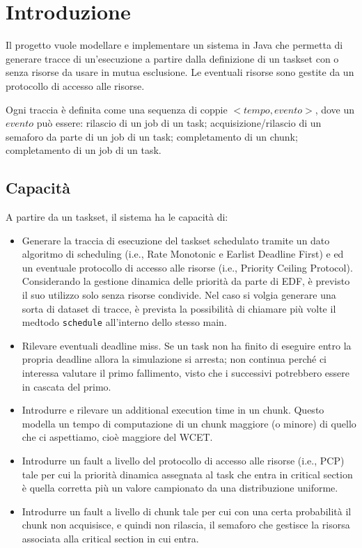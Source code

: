 \chapter{Introduzione}
Il progetto vuole modellare e implementare un sistema in Java che permetta di generare tracce di un'esecuzione a partire dalla definizione di un taskset con o senza risorse da usare in mutua esclusione. Le eventuali risorse sono gestite da un protocollo di accesso alle risorse.

Ogni traccia è definita come una sequenza di coppie $<tempo, evento>$, dove un $evento$ può essere: rilascio di un job di un task; acquisizione/rilascio di un semaforo da parte di un job di un task; completamento di un chunk; completamento di un job di un task.

\section{Capacità}
A partire da un taskset, il sistema ha le capacità di:
\begin{itemize}
    \item Generare la traccia di esecuzione del taskset schedulato tramite un dato algoritmo di scheduling (i.e., Rate Monotonic e Earlist Deadline First) e ed un eventuale protocollo di accesso alle risorse (i.e., Priority Ceiling Protocol). Considerando la gestione dinamica delle priorità da parte di EDF, è previsto il suo utilizzo solo senza risorse condivide. Nel caso si volgia generare una sorta di dataset di tracce, è prevista la possibilità di chiamare più volte il medtodo \texttt{schedule} all'interno dello stesso main.
    \item Rilevare eventuali deadline miss. Se un task non ha finito di eseguire entro la propria deadline allora la simulazione si arresta; non continua perché ci interessa valutare il primo fallimento, visto che i successivi potrebbero essere in cascata del primo.
    \item Introdurre e rilevare un additional execution time in un chunk. Questo modella un tempo di computazione di un chunk maggiore (o minore) di quello che ci aspettiamo, cioè maggiore del WCET.
    \item Introdurre un fault a livello del protocollo di accesso alle risorse (i.e., PCP) tale per cui la priorità dinamica assegnata al task che entra in critical section è quella corretta più un valore campionato da una distribuzione uniforme.
    \item Introdurre un fault a livello di chunk tale per cui con una certa probabilità il chunk non acquisisce, e quindi non rilascia, il semaforo che gestisce la risorsa associata alla critical section in cui entra.
\end{itemize}

